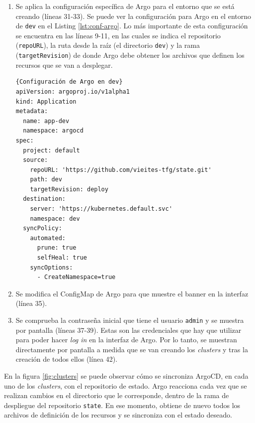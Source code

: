\begin{enumerate}
\begin{bclogo}[logo=\bcattention]{Important!}
    \end{bclogo}
  \item Se aplica la configuración específica de Argo para el entorno que se está creando (líneas 31-33). Se puede ver la configuración para Argo en el entorno de \texttt{dev} en el Listing \ref{lst:conf-argo}. Lo más importante de esta configuración se encuentra en las líneas 9-11, en las cuales se indica el repositorio (\texttt{repoURL}), la ruta desde la raíz (el directorio \texttt{dev}) y la rama (\texttt{targetRevision}) de donde Argo debe obtener los archivos que definen los recursos que se van a desplegar.
\begin{lstlisting}[language=helm,label=lst:conf-argo]{Configuración de Argo en dev}
apiVersion: argoproj.io/v1alpha1
kind: Application
metadata:
  name: app-dev
  namespace: argocd
spec:
  project: default
  source:
    repoURL: 'https://github.com/vieites-tfg/state.git'
    path: dev
    targetRevision: deploy
  destination:
    server: 'https://kubernetes.default.svc'
    namespace: dev
  syncPolicy:
    automated:
      prune: true
      selfHeal: true
    syncOptions:
      - CreateNamespace=true
\end{lstlisting}
  \item Se modifica el ConfigMap de Argo para que muestre el banner en la interfaz (línea 35).
  \item Se comprueba la contraseña inicial que tiene el usuario \texttt{admin} y se muestra por pantalla (líneas 37-39). Estas son las credenciales que hay que utilizar para poder hacer \textit{log in} en la interfaz de Argo. Por lo tanto, se muestran directamente por pantalla a medida que se van creando los \textit{clusters} y tras la creación de todos ellos (línea 42).
\end{enumerate}

En la figura \ref{fig:clusters} se puede observar cómo se sincroniza ArgoCD, en cada uno de los \textit{clusters}, con el repositorio de estado. Argo reacciona cada vez que se realizan cambios en el directorio que le corresponde, dentro de la rama de despliegue del repositorio \texttt{state}. En ese momento, obtiene de nuevo todos los archivos de definición de los recursos y se sincroniza con el estado deseado.

